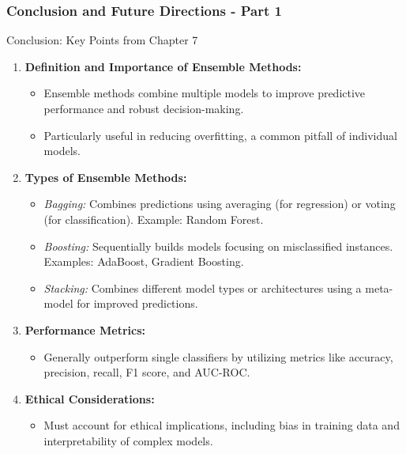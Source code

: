 \documentclass[aspectratio=169]{beamer}
\begin{document}
\begin{frame}[fragile]
  \frametitle{Conclusion and Future Directions - Part 1}
  \begin{block}{Conclusion: Key Points from Chapter 7}
    \begin{enumerate}
      \item \textbf{Definition and Importance of Ensemble Methods:}
      \begin{itemize}
          \item Ensemble methods combine multiple models to improve predictive performance and robust decision-making.
          \item Particularly useful in reducing overfitting, a common pitfall of individual models.
      \end{itemize}
      \item \textbf{Types of Ensemble Methods:}
      \begin{itemize}
          \item \textit{Bagging:} Combines predictions using averaging (for regression) or voting (for classification). Example: Random Forest.
          \item \textit{Boosting:} Sequentially builds models focusing on misclassified instances. Examples: AdaBoost, Gradient Boosting.
          \item \textit{Stacking:} Combines different model types or architectures using a meta-model for improved predictions.
      \end{itemize}
      \item \textbf{Performance Metrics:}
      \begin{itemize}
          \item Generally outperform single classifiers by utilizing metrics like accuracy, precision, recall, F1 score, and AUC-ROC.
      \end{itemize}
      \item \textbf{Ethical Considerations:}
      \begin{itemize}
          \item Must account for ethical implications, including bias in training data and interpretability of complex models.
      \end{itemize}
    \end{enumerate}
  \end{block}
\end{frame}
\end{document}
